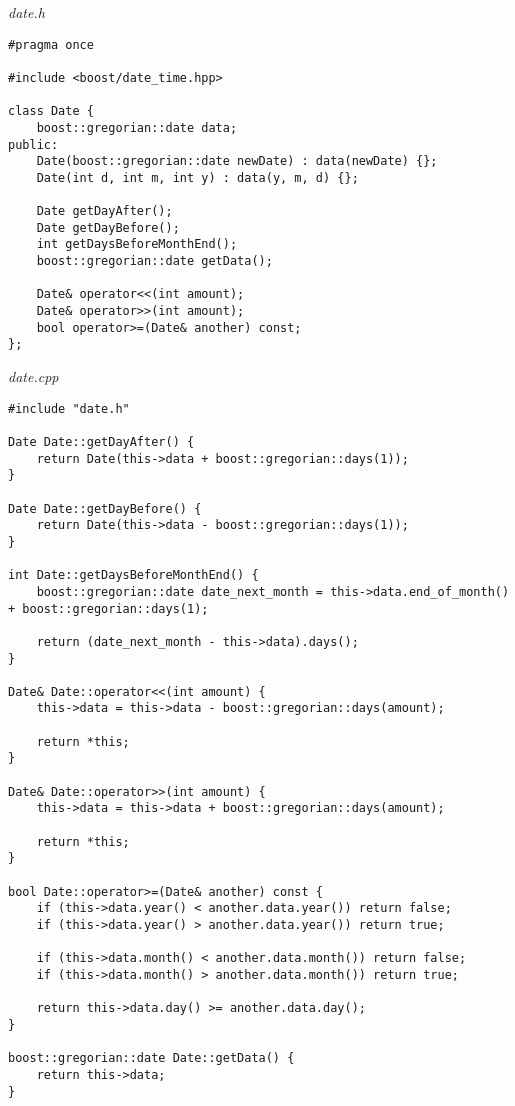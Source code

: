 \documentclass[a4paper,14pt]{extarticle}
\begin{document}
\textit{date.h}
\begin{verbatim}
#pragma once

#include <boost/date_time.hpp>

class Date {
    boost::gregorian::date data;
public:
    Date(boost::gregorian::date newDate) : data(newDate) {};
    Date(int d, int m, int y) : data(y, m, d) {};

    Date getDayAfter();
    Date getDayBefore();
    int getDaysBeforeMonthEnd();
    boost::gregorian::date getData();

    Date& operator<<(int amount);
    Date& operator>>(int amount);
    bool operator>=(Date& another) const;
};

\end{verbatim}

\textit{date.cpp}
\begin{verbatim}
#include "date.h"

Date Date::getDayAfter() {
    return Date(this->data + boost::gregorian::days(1));
}

Date Date::getDayBefore() {
    return Date(this->data - boost::gregorian::days(1));
}

int Date::getDaysBeforeMonthEnd() {
    boost::gregorian::date date_next_month = this->data.end_of_month() + boost::gregorian::days(1);

    return (date_next_month - this->data).days();
}

Date& Date::operator<<(int amount) {
    this->data = this->data - boost::gregorian::days(amount);

    return *this;
}

Date& Date::operator>>(int amount) {
    this->data = this->data + boost::gregorian::days(amount);

    return *this;
}

bool Date::operator>=(Date& another) const {
    if (this->data.year() < another.data.year()) return false;
    if (this->data.year() > another.data.year()) return true;

    if (this->data.month() < another.data.month()) return false;
    if (this->data.month() > another.data.month()) return true;

    return this->data.day() >= another.data.day();
}

boost::gregorian::date Date::getData() {
    return this->data;
}

\end{verbatim}
\end{document}

